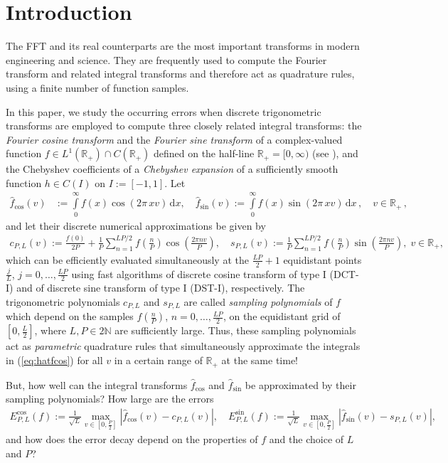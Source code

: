 \documentclass[11pt,a4paper]{scrartcl}
\renewcommand{\d}{\,\mathrm{d}}
\numberwithin{equation}{section}
\numberwithin{table}{section}
\numberwithin{figure}{section}
\newcommand{\Rp}{{\mathbb R}_{+}}
\newcommand{\fcos}{{\hat f}_{\cos}}
\newcommand{\fsin}{{\hat f}_{\sin}}
\begin{document}
\section{Introduction\label{sec:intro}}

The FFT and its real counterparts are the most important transforms in modern engineering and science. They are frequently used to compute the Fourier transform and  related integral transforms and therefore act as quadrature rules, using  a finite number of function samples.
\smallskip

In this paper, we study the occurring errors when discrete trigonometric transforms  are  employed to compute
three closely related integral
transforms:
the \emph{Fourier cosine
transform} and the \emph{Fourier sine transform} of a complex-valued function
$f \in L^1(\Rp) \cap C(\Rp)$ defined on the half-line $\Rp = [0,\infty)$ (see  \cite{Ob90}),
 and  the Chebyshev coefficients of  a \emph{Chebyshev expansion} of a sufficiently smooth function $h \in C(I)$ on $I := [-1,1]$.
Let
 \begin{align}
	\label{eq:hatfcos}
	\fcos(v) &:=  \textstyle \int\limits_0^{\infty} f(x)\cos(2\pi\,x v)\d x,
	\quad
	\fsin(v) := \int\limits_0^{\infty} f(x)\sin(2\pi\,x v)\d x\,,
	\quad v \in \Rp\,,
\end{align}
and let their discrete numerical approximations be given by
\begin{align}\label{eq:approx}
\textstyle c_{P,L} (v) \!:= \!  \tfrac{f(0)}{2P} + \tfrac{1}{P} \sum\limits_{n=1}^{LP/2} f(\frac{n}{P})  \cos(\tfrac{2\pi n v}{P}),
\quad
s_{P,L} (v) \!:=\!  \tfrac{1}{P} \sum\limits_{n=1}^{LP/2} f(\tfrac{n}{P})  \sin(\tfrac{2\pi n v}{P}),
\; v \in \Rp,
\end{align}
which can be efficiently evaluated simultaneously at the $\frac{LP}{2}+1$ equidistant
points $\frac{j}{L}$, $j = 0,\ldots,\frac{LP}{2}$  using  fast algorithms of discrete cosine transform  of type I (DCT-I) and
of discrete sine transform of type I (DST-I), respectively. The trigonometric polynomials $c_{P,L}$ and $s_{P,L}$ are called \emph{sampling polynomials} of $f$ which depend on the samples $f(\frac{n}{P})$, $n=0, \ldots , \frac{LP}{2}$, on the equidistant grid of $[0, \frac{L}{2}]$, where $L, P \in 2{\mathbb N}$ are sufficiently large.
Thus, these  sampling polynomials act as \emph{parametric} quadrature rules that simultaneously approximate the integrals in (\ref{eq:hatfcos})  for all $v$ in a certain range of  $\Rp$ at the same time!

But, how  well can the integral transforms $\fcos$ and $\fsin$ be approximated by their sampling polynomials? How large are the errors
\begin{align}\label{eq:errors}
E_{P,L}^{\cos}(f)\!:= \textstyle \frac{1}{\sqrt{L}} \max\limits_{v \in [0,\frac{P}{2}]} |\hat{f}_{\cos} (v)\! - \!c_{P,L}(v)|, \quad
E_{P,L}^{\sin}(f)\!:= \textstyle \frac{1}{\sqrt{L}} \max\limits_{v \in [0,\frac{P}{2}]} |\hat{f}_{\sin} (v) \!-\! s_{P,L}(v)|,
\end{align}
and how does the error decay depend on the properties of $f$ and the choice of $L$ and $
P$?
\end{document}
